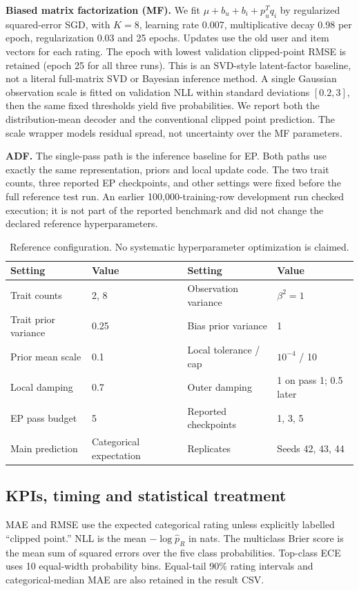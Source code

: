 \documentclass[11pt,a4paper]{article}
\begin{document}
\textbf{Biased matrix factorization (MF).} We fit
$\mu+b_u+b_i+p_u^Tq_i$ by regularized squared-error SGD, with $K=8$, learning
rate 0.007, multiplicative decay 0.98 per epoch, regularization 0.03 and 25
epochs. Updates use the old user and item vectors for each rating. The epoch
with lowest validation clipped-point RMSE is retained (epoch 25 for all three
runs). This is an SVD-style latent-factor baseline, not a literal full-matrix
SVD or Bayesian inference method. A single Gaussian observation scale is fitted
on validation NLL within standard deviations $[0.2,3]$, then the same fixed
thresholds yield five probabilities. We report both the distribution-mean
decoder and the conventional clipped point prediction. The scale wrapper models
residual spread, not uncertainty over the MF parameters.

\textbf{ADF.} The single-pass path is the inference baseline for EP. Both paths
use exactly the same representation, priors and local update code. The two
trait counts, three reported EP checkpoints, and other settings were fixed before
the full reference test run. An earlier 100,000-training-row development run
checked execution; it is not part of the reported benchmark and did not change
the declared reference hyperparameters.

\begin{table}[htbp]\centering\small
\begin{tabularx}{\linewidth}{@{}lXlX@{}}\toprule
Setting & Value & Setting & Value\\\midrule
Trait counts & 2, 8 & Observation variance & $\beta^2=1$\\
Trait prior variance & 0.25 & Bias prior variance & 1\\
Prior mean scale & 0.1 & Local tolerance / cap & $10^{-4}$ / 10\\
Local damping & 0.7 & Outer damping & 1 on pass 1; 0.5 later\\
EP pass budget & 5 & Reported checkpoints & 1, 3, 5\\
Main prediction & Categorical expectation & Replicates & Seeds 42, 43, 44\\\bottomrule
\end{tabularx}
\caption{Reference configuration. No systematic hyperparameter optimization is claimed.}
\end{table}

\subsection{KPIs, timing and statistical treatment}
MAE and RMSE use the expected categorical rating unless explicitly labelled
``clipped point.'' NLL is the mean $-\log\widehat p_{R}$ in nats. The multiclass
Brier score is the mean sum of squared errors over the five class probabilities.
Top-class ECE uses 10 equal-width probability bins. Equal-tail 90\% rating
intervals and categorical-median MAE are also retained in the result CSV.
\end{document}
